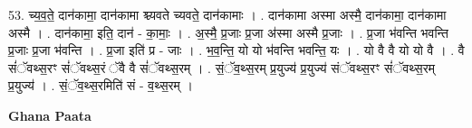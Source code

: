 \documentclass[17pt]{extarticle}
\begin{document}
53. च्य॒व॒ते॒ दान॑कामा॒ दान॑कामा श्च्यवते च्यवते॒ दान॑कामाः । . दान॑कामा अस्मा अस्मै॒ दान॑कामा॒ दान॑कामा अस्मै । . दान॑कामा॒ इति॒ दान॑ - का॒माः॒ । . अ॒स्मै॒ प्र॒जाः प्र॒जा अ॑स्मा अस्मै प्र॒जाः । . प्र॒जा भ॑वन्ति भवन्ति प्र॒जाः प्र॒जा भ॑वन्ति । . प्र॒जा इति॑ प्र - जाः । . भ॒व॒न्ति॒ यो यो भ॑वन्ति भवन्ति॒ यः । . यो वै वै यो यो वै । . वै सं॑ॅवथ्स॒रꣳ सं॑ॅवथ्स॒रं ॅवै वै सं॑ॅवथ्स॒रम् । . सं॒ॅव॒थ्स॒रम् प्र॒युज्य॑ प्र॒युज्य॑ संॅवथ्स॒रꣳ सं॑ॅवथ्स॒रम् प्र॒युज्य॑ । . सं॒ॅव॒थ्स॒रमिति॑ सं - व॒थ्स॒रम् । \newline

\textbf{Ghana Paata } \newline
\end{document}
